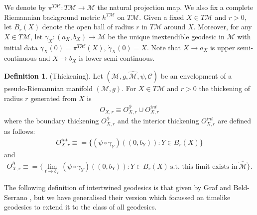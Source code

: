 \documentclass[pdflatex,sn-mathphys-num]{sn-jnl}
\theoremstyle{definition}
\newtheorem{defn}[theorem]{Definition}
\begin{document}
We denote by $\pi^{T\mathcal{M}}:T\mathcal{M} \rightarrow \mathcal{M}$ the natural projection map. We also fix a complete Riemannian background metric $h^{T\mathcal{M}}$ on $T\mathcal{M}$. Given a fixed $X \in T\mathcal{M}$ and $r>0$, let $B_r(X)$ denote the open ball of radius $r$ in $T\mathcal{M}$ around $X$. Moreover, for any $X \in T\mathcal{M}$, let $\gamma_{X}:(a_X,b_X) \rightarrow \mathcal{M}$ be the unique inextendible geodesic in $\mathcal{M}$ with initial data $\gamma_X(0) = \pi^{T\mathcal{M}}(X)$, $\dot{\gamma}_{X}(0) = X$. Note that $X \rightarrow a_X$ is upper semi-continuous and $X \rightarrow b_X$ is lower semi-continuous.
\begin{defn}(Thickening).
    Let $(\mathcal{M},g,\hat{\mathcal{M}},\psi,\mathcal{C})$ be an envelopment of a pseudo-Riemannian manifold $(\mathcal{M},g)$. For $X \in T\mathcal{M}$ and $r>0$ the thickening of radius $r$ generated from $X$ is
    \begin{align}\label{Thickening}
        O_{X,r} \equiv O^{\partial}_{X,r} \cup O^{int}_{X,r}
    \end{align}
    where the boundary thickening $O^{\partial}_{X,r}$ and the interior thickening $O^{int}_{X,r}$ are defined as follows:
    \begin{align}
        O^{int}_{X,r} \equiv = \{(\psi \circ \gamma_{Y})((0,b_{Y})):Y \in B_r(X) \}
    \end{align}
    and 
    \begin{align}
        O^{\partial}_{X,r} \equiv = \{\lim_{t \rightarrow b^{-}_Y}(\psi \circ \gamma_{Y})((0,b_{Y})):Y \in B_r(X) ~\text{s.t.\ this limit exists in}~\hat{\mathcal{M}}\}.
    \end{align}
\end{defn}

The following definition of intertwined geodesics is that given by Graf and Beld-Serrano \cite{Graf_2024}, but we have generalised their version which focussed on timelike geodesics to extend it to the class of all geodesics.
\end{document}
